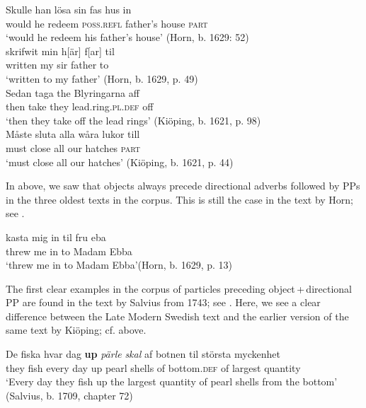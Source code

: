 \documentclass[output=paper]{langscibook}
\begin{document}
\ea\label{ex:lalu:40}
\ea\label{ex:lalu:40a}
\gll  Skulle  han   lösa     sin         fas       hus in\\
    would  he   redeem   \textsc{poss.refl}   father’s   house   \textsc{part}\\
\glt `would he redeem his father’s house’ (Horn, b. 1629: 52)\\

\ex\label{ex:lalu:40b}
\gll  skrifwit   min   h[är] f[ar] til\\
    written   my   sir   father   to \\
\glt `written to my father’ (Horn, b. 1629, p. 49)\\
\z
\ex\label{ex:lalu:41}
\ea
\gll  Sedan   taga   the     Blyringarna     aff\\
    then     take   they   lead.ring.\textsc{pl.def}   off\\
\glt `then they take off the lead rings’ (Kiöping, b. 1621, p. 98)\\

\ex
\gll  Måste   sluta     alla   wåra   lukor     till \\
    must     close     all   our   hatches   \textsc{part}\\
\glt `must close all our hatches’ (Kiöping, b. 1621, p. 44)\\
\z
\z


In  above, we saw that objects always precede directional adverbs followed by PPs in the three oldest texts in the corpus. This is still the case in the text by Horn; see .


\ea\label{ex:lalu:42}
\gll  kasta     mig   in     til     fru     eba\\
threw       me   in     to     Madam   Ebba\\
\glt `threw me in to Madam Ebba’(Horn, b. 1629, p. 13)\\
\z

\begin{sloppypar}
The first clear examples in the corpus of particles preceding object\,+\,directional PP are found in the text by Salvius from 1743; see . Here, we see a clear difference between the Late Modern Swedish text and the earlier version of the same text by Kiöping; cf.  above.
\end{sloppypar}

\ea\label{ex:lalu:43}
\gll  De {fiska} {hvar}     {dag} \textbf{up} \textit{pärle} \textit{skal} {af} {botnen} {til} {största} {myckenhet}\\
they   fish     every   day     up     pearl   shells   of     bottom\textsc{.def} of     largest     quantity\\
\glt `Every day they fish up the largest quantity of pearl shells from the bottom'   (Salvius, b. 1709, chapter 72)\\
\z
\end{document}

